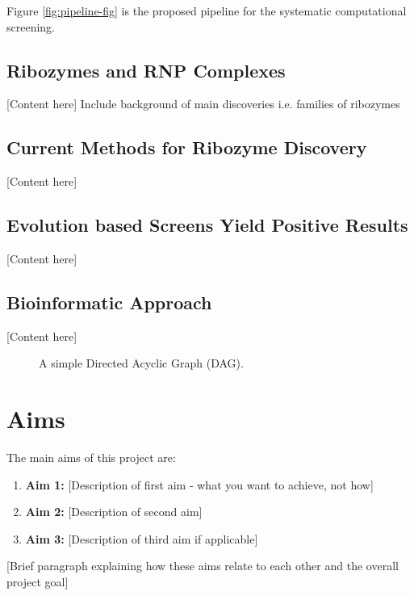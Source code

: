 \documentclass[12pt]{report}
\begin{document}
Figure \ref{fig:pipeline-fig} is the proposed pipeline for the systematic computational screening.

\subsection{Ribozymes and RNP Complexes}

[Content here]
Include background of main discoveries i.e. families of ribozymes

\subsection{Current Methods for Ribozyme Discovery}

[Content here]

\subsection{Evolution based Screens Yield Positive Results}

[Content here]

\subsection{Bioinformatic Approach}

[Content here]

\begin{figure}[H]
    \centering
    
    \caption{A simple Directed Acyclic Graph (DAG).}
    \label{fig:simple_dag}
\end{figure}

\section{Aims}

The main aims of this project are:

\begin{enumerate}
    \item \textbf{Aim 1:} [Description of first aim - what you want to achieve, not how]
    
    \item \textbf{Aim 2:} [Description of second aim]
    
    \item \textbf{Aim 3:} [Description of third aim if applicable]
\end{enumerate}

[Brief paragraph explaining how these aims relate to each other and the overall project goal]

\newpage
\end{document}
